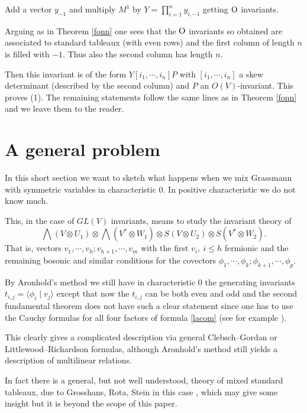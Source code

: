 \documentclass[10pt]{amsart}
\theoremstyle{definition}
\theoremstyle{remark}
\begin{document}
Add a vector $y_{-1}$  and multiply $M^1$ by $Y=\prod_{i=1}^n y_{i,-1}$  getting $\rm  O$ invariants.\smallskip



Arguing as in Theorem \ref{fonn} one sees that the $\rm  O$ invariants so obtained are associated to standard tableaux (with even rows) and the first column of length   $n$ is filled with $-1$.   Thus also the  second column has length $n$.\smallskip

Then this invariant is of the form  $Y [i_1,\cdots,i_n] P$  with $[i_1,\cdots,i_n]$ a skew determinant (described by the second column)  and $P$ an $O(V)$-invariant. This proves (1). The remaining statements follow the same lines as in Theorem \ref{fonn} and we leave them to the reader.

 

\section{A general problem} In this short section we want to sketch what happens  when we mix Grassmann   with symmetric  variables in characteristic 0. In positive characteristic we do not know much.\smallskip

This, in the case of $GL(V)$ invariants,  means to study the invariant theory of
\begin{equation}\label{lacom}
\bigwedge (V\otimes U_1)\otimes \bigwedge (V^*\otimes W_1)\otimes S(V\otimes U_2)\otimes  S(V^*\otimes W_2).
\end{equation} 
That is, vectors $v_1,\cdots,v_h; v_{h+1},\cdots, v_m$  with   the first $v_i,\ i\leq h$ fermionic and the remaining bosonic and similar conditions for the covectors $\phi_1,\cdots,\phi_k; \phi_{k+1},\cdots, \phi_p$.\smallskip


By Aronhold's method we still have in characteristic 0 the generating invariants  $t_{i,j}=\langle \phi_i\mid v_j\rangle$  except that now the $t_{i,j}$ can be both even and odd and  the second fundamental theorem does not have such a clear statement since one has to use the Cauchy formulas for all four factors of formula \eqref{lacom} (see for example \cite{ser}).

This clearly gives a complicated description via general  Clebsch--Gordan or Littlewood--Richardson formulas, although Aronhold's method still yields a description of multilinear relations.\medskip

In fact there is a general, but not well understood, theory of mixed standard tableaux, due to Grosshans, Rota, Stein in this case \cite{GrosshansRotaStein}, which may give some insight but it is beyond the scope of this paper.\smallskip
\end{document}
